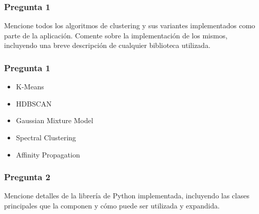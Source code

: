 \begin{frame}
    \frametitle{Pregunta 1}

    Mencione todos los algoritmos de clustering y sus variantes implementados como parte de la aplicación.
    Comente sobre la implementación de los mismos, incluyendo una breve descripción de cualquier biblioteca utilizada.

\end{frame}

\begin{frame}
    \frametitle{Pregunta 1}

    \begin{itemize}
        \item K-Means

        \item HDBSCAN

        \item Gaussian Mixture Model

        \item Spectral Clustering
        \item Affinity Propagation
    \end{itemize}

\end{frame}

\begin{frame}
    \frametitle{Pregunta 2}

    Mencione detalles de la librería de Python implementada, incluyendo las clases principales que la componen y cómo puede ser utilizada y expandida.

\end{frame}


